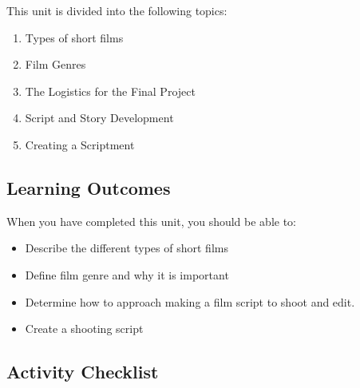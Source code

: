 \documentclass[
]{book}
\providecommand{\tightlist}{%
  \setlength{\itemsep}{0pt}\setlength{\parskip}{0pt}}
\begin{document}
This unit is divided into the following topics:

\begin{enumerate}
\def\labelenumi{\arabic{enumi}.}
\tightlist
\item
  Types of short films\\
\item
  Film Genres\\
\item
  The Logistics for the Final Project\\
\item
  Script and Story Development\\
\item
  Creating a Scriptment
\end{enumerate}

\hypertarget{learning-outcomes-7}{%
\subsection*{Learning Outcomes}\label{learning-outcomes-7}}

When you have completed this unit, you should be able to:

\begin{itemize}
\tightlist
\item
  Describe the different types of short films\\
\item
  Define film genre and why it is important\\
\item
  Determine how to approach making a film script to shoot and edit.\\
\item
  Create a shooting script
\end{itemize}

\hypertarget{activity-checklist-7}{%
\subsection*{Activity Checklist}\label{activity-checklist-7}}
\end{document}
